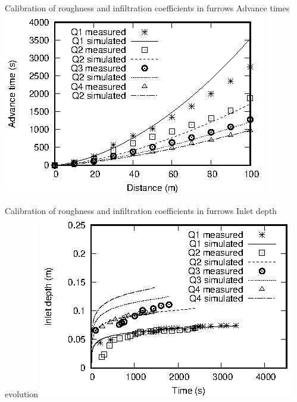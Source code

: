\documentclass[10pt]{beamer}
\begin{document}
\begin{frame}{Calibration of roughness and infiltration coefficients in furrows}
{Advance times}
	\includegraphics[width=\textwidth]{surcos-advance.eps}
\end{frame}

\begin{frame}{Calibration of roughness and infiltration coefficients in furrows}
{Inlet depth evolution}
	\includegraphics[width=\textwidth]{surcos-depth.eps}
\end{frame}
\end{document}
